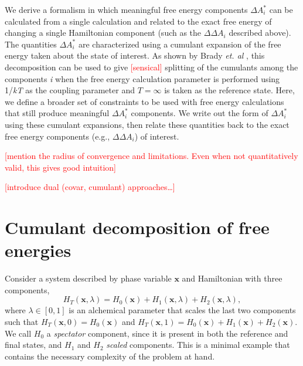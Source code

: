 \documentclass[%
 preprint,
 amsmath,amssymb,
 aps,
]{revtex4-1}
\newcommand{\warning}[1]{{\textsf{{\textcolor{red}{{[#1]}{}}}}}}
\renewcommand{\vec}[1]{{\mathbf{#1}}}
\begin{document}
We derive a formalism in which meaningful free energy components $\Delta A^*_i$ can be calculated from a single calculation and related to the exact free energy of changing a single Hamiltonian component (such as the $\Delta \Delta A_i$ described above).  The quantities $\Delta A^*_i$ are characterized using a cumulant expansion of the free energy taken about the state of interest.  As shown by Brady \emph{et. al} \cite{Brady:1996gm}, this decomposition can be used to give \warning{sensical} splitting of the cumulants among the components \textit{i} when the free energy calculation parameter is performed using 1/\emph{kT} as the coupling parameter and $T=\infty$ is taken as the reference state.  Here, we define a broader set of constraints to be used with free energy calculations that still produce meaningful $\Delta A^*_i$ components.  We write out the form of $\Delta A^*_i$ using these cumulant expansions, then relate these quantities back to the exact free energy components (e.g., $\Delta \Delta A_i$) of interest.  

\warning{mention the radius of convergence and limitations.  Even when not quantitatively valid, this gives good intuition}

\warning{introduce dual (covar, cumulant) approaches\dots}


\section{Cumulant decomposition of free energies}
\label{S:CumulantGeneral}

Consider a system described by phase variable $\vec{x}$ and Hamiltonian with three components,
\begin{equation}
H_T(\vec{x},\lambda) = H_0(\vec{x}) + H_1(\vec{x},\lambda) + H_2(\vec{x},\lambda),
\end{equation}
where $\lambda \in [ 0, 1] $ is an alchemical parameter that scales the last two components such that 
$
H_T(\vec{x},0) = H_0 (\vec{x})
$
and 
$
H_T(\vec{x},1) = H_0(\vec{x}) + H_1(\vec{x}) + H_2(\vec{x}).
$
We call $H_0$ a \emph{spectator} component, since it is present in both the reference and final states, and $H_1$ and $H_2$ \emph{scaled} components.  This is a minimal example that contains the necessary complexity of the problem at hand.
 
\end{document}
